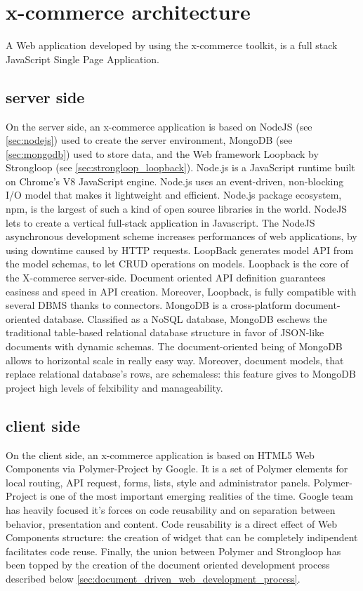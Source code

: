 \section{x-commerce architecture}
\label{sec:x_commerce_architecture}
A Web application developed by using the x-commerce toolkit, is a full stack JavaScript Single Page Application.
\subsection{server side}
On the server side, an x-commerce application is based on NodeJS (see \ref{sec:nodejs}) used to create the server environment, MongoDB (see \ref{sec:mongodb}) used to store data, and the Web framework Loopback by Strongloop (see \ref{sec:strongloop_loopback}).
\newline
Node.js is a JavaScript runtime built on Chrome’s V8 JavaScript engine. Node.js uses an event-driven, non-blocking I/O model that makes it lightweight and efficient. Node.js package ecosystem, npm, is the largest of such a kind of open source libraries in the world. NodeJS lets to create a vertical full-stack application in Javascript. The NodeJS asynchronous development scheme increases performances of web applications, by using downtime caused by HTTP requests.
\newline
LoopBack generates model API from the model schemas, to let CRUD operations on models. Loopback is the core of the X-commerce server-side. Document oriented API definition guarantees easiness and speed in API creation. Moreover, Loopback, is fully compatible with several DBMS thanks to connectors.
\newline
MongoDB is a cross-platform document-oriented database. Classified as a NoSQL database, MongoDB eschews the traditional table-based relational database structure in favor of JSON-like documents with dynamic schemas. The document-oriented being of MongoDB allows to horizontal scale in really easy way. Moreover, document models, that replace relational database’s rows, are schemaless: this feature gives to MongoDB project high levels of felxibility and manageability.
\subsection{client side}
On the client side, an x-commerce application is based on HTML5 Web Components via Polymer-Project by Google. It is a set of Polymer elements for local routing, API request, forms, lists, style and administrator panels.
\newline
Polymer-Project is one of the most important emerging realities of the time. Google team has heavily focused it's forces on code reusability and on separation between behavior, presentation and content. Code reusability is a direct effect of Web Components structure: the creation of widget that can be completely indipendent facilitates code reuse.
\newline
Finally, the union between Polymer and Strongloop has been topped by the creation of the document oriented development process described below \ref{sec:document_driven_web_development_process}.